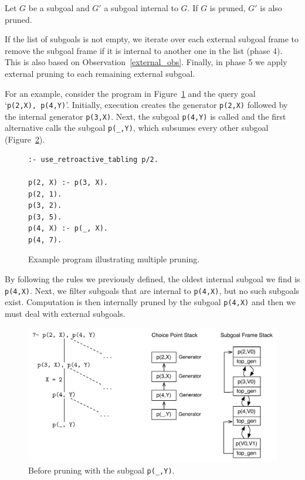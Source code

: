 \begin{pruning_obs}\label{external_obs}
Let $G$ be a subgoal and $G'$ a subgoal internal to $G$. If $G$ is pruned, $G'$ is also pruned.
\end{pruning_obs}

If the list of subgoals is not empty, we iterate over each external subgoal frame to remove the subgoal frame if
it is internal to another one in the list (phase 4). This is also based on Observation~\ref{external_obs}.
Finally, in phase 5 we apply external pruning to each remaining external subgoal.

For an example, consider the program in Figure~\ref{fig:retro_mix_program} and the query goal
`\texttt{p(2,X),~p(4,Y)}'. Initially, execution creates the generator \texttt{p(2,X)} followed by the internal
generator \texttt{p(3,X)}. Next, the subgoal \texttt{p(4,Y)} is called and the first alternative calls the
subgoal \texttt{p(\_,Y)}, which subsumes every other subgoal (Figure~\ref{fig:retro_mix_multiple_before}).

\begin{figure}[ht]
\begin{Verbatim}
:- use_retroactive_tabling p/2.

p(2, X) :- p(3, X).
p(2, 1).
p(3, 2).
p(3, 5).
p(4, X) :- p(_, X).
p(4, 7).
\end{Verbatim}
\caption{Example program illustrating multiple pruning.}
\label{fig:retro_mix_program}
\end{figure}

By following the rules we previously defined, the oldest internal subgoal we find is \texttt{p(4,X)}.
Next, we filter subgoals that are internal to \texttt{p(4,X)}, but no such subgoals exist. Computation is
then internally pruned by the subgoal \texttt{p(4,X)} and then we must deal with external subgoals.

\begin{figure}[ht]
  \centering
    \includegraphics[scale=0.6]{retro_mix_multiple_before.pdf}
  \caption{Before pruning with the subgoal \texttt{p(\_,Y)}.}
  \label{fig:retro_mix_multiple_before}
\end{figure}

